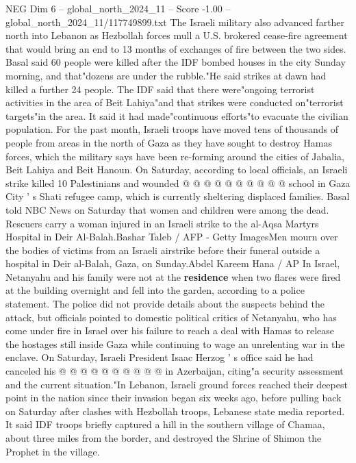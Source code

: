 \begin{textsample}{NEG Dim 6 – global\_north\_2024\_11 – Score -1.00 – global\_north\_2024\_11/117749899.txt}  \label{ex:f6_neg_104}
The Israeli military also advanced farther north into Lebanon as Hezbollah forces mull a U.S. brokered cease-fire agreement that would bring an end to 13 months of exchanges of fire between the two sides.
Basal said 60 people were killed after the IDF bombed houses in the city Sunday morning, and that"dozens are under the rubble."He said strikes at dawn had killed a further 24 people.
The IDF said that there were"ongoing terrorist activities in the area of Beit Lahiya"and that strikes were conducted on"terrorist targets"in the area.
It said it had made"continuous efforts"to evacuate the civilian population.
For the past month, Israeli troops have moved tens of thousands of people from areas in the north of Gaza as they have sought to destroy Hamas forces, which the military says have been re-forming around the cities of Jabalia, Beit Lahiya and Beit Hanoun.
On Saturday, according to local officials, an Israeli strike killed 10 Palestinians and wounded @ @ @ @ @ @ @ @ @ @ school in Gaza City ' s Shati refugee camp, which is currently sheltering displaced families.
Basal told NBC News on Saturday that women and children were among the dead.
Rescuers carry a woman injured in an Israeli strike to the al-Aqsa Martyrs Hospital in Deir Al-Balah.Bashar Taleb / AFP - Getty ImagesMen mourn over the bodies of victims from an Israeli airstrike before their funeral outside a hospital in Deir al-Balah, Gaza, on Sunday.Abdel Kareem Hana / AP In Israel, Netanyahu and his family were not at the \textbf{residence} when two flares were fired at the building overnight and fell into the garden, according to a police statement.
The police did not provide details about the suspects behind the attack, but officials pointed to domestic political critics of Netanyahu, who has come under fire in Israel over his failure to reach a deal with Hamas to release the hostages still inside Gaza while continuing to wage an unrelenting war in the enclave.
On Saturday, Israeli President Isaac Herzog ' s office said he had canceled his @ @ @ @ @ @ @ @ @ @ in Azerbaijan, citing"a security assessment and the current situation."In Lebanon, Israeli ground forces reached their deepest point in the nation since their invasion began six weeks ago, before pulling back on Saturday after clashes with Hezbollah troops, Lebanese state media reported.
It said IDF troops briefly captured a hill in the southern village of Chamaa, about three miles from the border, and destroyed the Shrine of Shimon the Prophet in the village.

\end{textsample}
